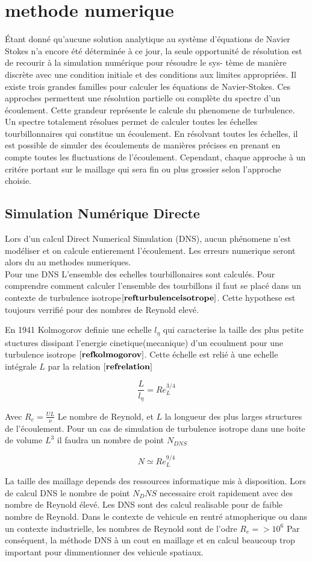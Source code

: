 \section{methode numerique}
Étant donné qu’aucune solution analytique au système d’équations de
Navier Stokes n’a encore été déterminée à ce jour, la seule opportunité de
résolution est de recourir à la simulation numérique pour résoudre le sys-
tème de manière discrète avec une condition initiale et des conditions aux
limites appropriées.
Il existe trois grandes familles pour calculer les équations de Navier-Stokes.
Ces approches permettent une résolution partielle ou complète du spectre d'un écoulement.
Cette grandeur représente le calcule du phenomene de turbulence. Un spectre totalement résolues permet de calculer toutes les échelles  tourbillonnaires qui constitue un écoulement.
En résolvant toutes les échelles, il est possible de simuler des écoulements de manières précises en prenant en compte toutes les fluctuations de l'écoulement.
Cependant, chaque approche à un critére portant sur le maillage qui sera fin ou plus grossier selon l'approche choisie.

\subsection{Simulation Numérique Directe}

Lors d'un calcul Direct Numerical Simulation (DNS), aucun phénomene n'est modéliser et on calcule entierement l'écoulement. Les erreurs numerique seront alors du au methodes numeriques.\\
Pour une DNS L'ensemble des echelles tourbillonaires sont calculés. Pour comprendre comment calculer l'ensemble des tourbillons il faut se placé dans un contexte de turbulence isotrope$\bf{[ref turbulence isotrope]}$. Cette hypothese est toujours verrifié pour des nombres de Reynold elevé.

En 1941 Kolmogorov definie une echelle $l_{\eta}$ qui caracterise la taille des plus petite stuctures dissipant l'energie cinetique(mecanique) d'un ecoulment pour une turbulence isotrope $\bf{[ref kolmogorov]}$.  Cette échelle est relié à une echelle intégrale $L$ par la relation $\bf{[ref relation]}$

$$
\frac{L}{l_{\eta}}=R e_{L}^{3 / 4}
$$

Avec $R_e=\frac{UL}{\nu}$ Le nombre de Reynold, et $L$ la longueur des plus larges structures de l'écoulement.
Pour un cas de simulation de turbulence isotrope dans une boite de volume  $L^3$ il faudra un nombre de point $N_{DNS}$

$$
N \simeq R e_{L}^{9 / 4}
$$

La taille des maillage depends des ressources informatique mis à disposition. Lors de calcul DNS le nombre de point $N_DNS $ necessaire croit rapidement avec des nombre de Reynold élevé. Les DNS sont des calcul realisable pour de faible nombre de Reynold. Dans le contexte de vehicule en rentré atmopherique ou dans un contexte industrielle, les nombres de Reynold sont de l'odre $R_e=>10^{6}$
Par conséquent, la méthode DNS à un cout en maillage et en calcul beaucoup trop important pour dimmentionner des vehicule spatiaux.

